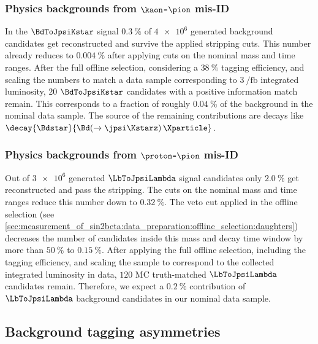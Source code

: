 \subsubsection{Physics backgrounds from $\kaon$-$\pion$ mis-ID}
\label{sec:measurement_of_sin2beta:physic_backgrounds:physic_backgrounds:kstar}

In the $\BdToJpsiKstar$ signal \MC $\SI{0.3}{\percent}$ of $\num{4e6}$ generated
background candidates get reconstructed and survive the applied stripping cuts.
This number already reduces to $\SI{0.004}{\percent}$ after applying cuts on the
nominal mass and time ranges. After the full offline selection, considering a
$\SI{38}{\percent}$ tagging efficiency, and scaling the numbers to match a data
sample corresponding to $\SI[separate-uncertainty=true]{3}{\per\femto\barn}$
integrated luminosity, $\num{20}$ $\BdToJpsiKstar$ candidates with a positive
\MC information match remain. This corresponds to a fraction of roughly
$\SI{0.04}{\percent}$ of the background in the nominal data sample. The source
of the remaining contributions are \eg decays like
$\decay{\Bdstar}{\Bd(\to\jpsi\Kstarz)\,\Xparticle}$.

\subsubsection{Physics backgrounds from $\proton$-$\pion$ mis-ID}
\label{sec:measurement_of_sin2beta:physic_backgrounds:physic_backgrounds:lambda}

Out of $\num{3e6}$ generated $\LbToJpsiLambda$ signal candidates only
$\SI{2.0}{\percent}$ get reconstructed and pass the stripping. The cuts on the
nominal mass and time ranges reduce this number down to $\SI{0.32}{\percent}$.
The veto cut applied in the offline selection (see
\cref{sec:measurement_of_sin2beta:data_preparation:offline_selection:daughters})
decreases the number of candidates inside this mass and decay time window by
more than $\SI{50}{\percent}$ to $\SI{0.15}{\percent}$. After applying the full
offline selection, including the tagging efficiency, and scaling the sample to
correspond to the collected integrated luminosity in data, $\num{120}$ MC
truth-matched $\LbToJpsiLambda$ candidates remain. Therefore, we expect a
$\SI{0.2}{\percent}$ contribution of $\LbToJpsiLambda$ background candidates in
our nominal data sample.

\subsection{Background tagging asymmetries}
\label{sec:measurement_of_sin2beta:physic_backgrounds:tagging_asymmetries}

